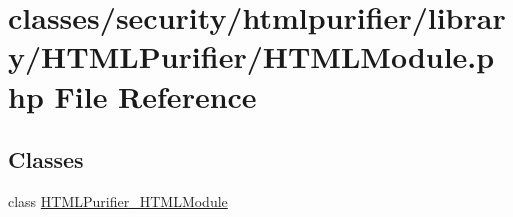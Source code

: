 \hypertarget{HTMLModule_8php}{\section{classes/security/htmlpurifier/library/\+H\+T\+M\+L\+Purifier/\+H\+T\+M\+L\+Module.php File Reference}
\label{HTMLModule_8php}
}
\subsection*{Classes}
\begin{DoxyCompactItemize}
\item 
class \hyperlink{classHTMLPurifier__HTMLModule}{H\+T\+M\+L\+Purifier\+\_\+\+H\+T\+M\+L\+Module}
\end{DoxyCompactItemize}

